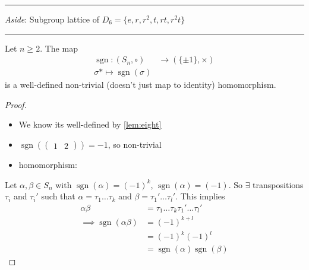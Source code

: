 \begin{center}\rule{0.5\linewidth}{0.5pt}\end{center}

\emph{Aside}: Subgroup lattice of \(D_6 = \{ e, r, r^2, t, rt, r^2t \}\)


\begin{center}\rule{0.5\linewidth}{0.5pt}\end{center}

\begin{theorem}
\protect\hypertarget{thm:two}{}\label{thm:two}Let \(n \geq 2\).
The map
\begin{align*}
    \operatorname{sgn} : (S_n, \circ) &\to \left( \{ \pm 1 \}, \times \right) \\
    \sigma *\mapsto \operatorname{sgn}(\sigma)
\end{align*}
is a well-defined non-trivial (doesn't just map to identity) homomorphism.
\end{theorem}

\begin{proof}
~

\begin{itemize}
\item
  We know its well-defined by \ref{lem:eight}
\item
  \(\operatorname{sgn}\left( \begin{pmatrix}1 & 2\end{pmatrix} \right) = -1\), so non-trivial
\item
  homomorphism:
\end{itemize}

Let \(\alpha, \beta \in S_n\) with \(\operatorname{sgn} (\alpha) = (-1)^k\), \(\operatorname{sgn} (\alpha) = (-1)\).
So \(\exists\) transpositions \(\tau_i\) and \(\tau_i'\) such that \(\alpha = \tau_1 \ldots \tau_k\) and \(\beta = \tau_1' \ldots \tau_l'\).
This implies
\begin{align*}
    \alpha \beta &= \tau_1 \ldots \tau_k \tau_1' \ldots \tau_l' \\
    \implies \operatorname{sgn}(\alpha \beta) &= (-1)^{k + l} \\
    &= (-1)^k (-1)^l \\
    &= \operatorname{sgn}(\alpha) \operatorname{sgn}(\beta)
\end{align*}
\end{proof}

